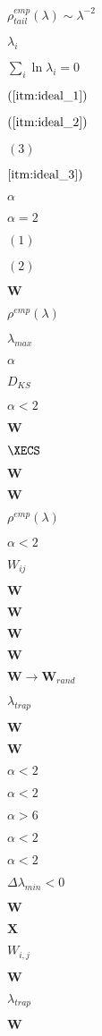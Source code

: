 $\rho^{emp}_{tail}(\lambda)\sim\lambda^{-2}$

$\lambda_{i}$

$\sum_{i}\ln\lambda_{i}=0$

$(\ref{itm:ideal_1})$

$(\ref{itm:ideal_2})$

$(3)$

$\ref{itm:ideal_3})$

$\alpha$

$\alpha=2$

$(1)$

$(2)$


$\mathbf{W}$

$\rho^{emp}(\lambda)$

$\lambda_{max}$

$\alpha$

$D_{KS}$

$\alpha<2$

$\mathbf{W}$

$\XECS$

$\mathbf{W}$

$\mathbf{W}$

$\rho^{emp}(\lambda)$

$\alpha< 2$

$W_{ij}$

$\mathbf{W}$

$\mathbf{W}$

$\mathbf{W}$

$\mathbf{W}$

$\mathbf{W}\rightarrow\mathbf{W}_{rand}$

$\lambda_{trap}$

$\mathbf{W}$

$\mathbf{W}$

$\alpha < 2$

$\alpha<2$

$\alpha>6$

$\alpha < 2$

$\alpha < 2$

$\Delta \lambda_{min}< 0$


$\mathbf{W}$

$\mathbf{X}$

$W_{i,j}$

$\mathbf{W}$

$\lambda_{trap}$

$\mathbf{W}$

